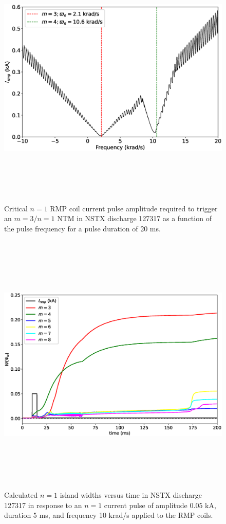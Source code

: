 \documentclass[12pt,prb,aps]{revtex4-1}
\begin{document}
\begin{figure}
\centerline{\includegraphics[height=5in]{Fig9.eps}}
\caption{Critical $n=1$ RMP coil current pulse amplitude required to trigger an $m=3/n=1$ NTM in NSTX discharge 127317 
as a function of the pulse frequency for a pulse duration of 20 ms.}\label{fig9}
\end{figure}

\begin{figure}
\centerline{\includegraphics[height=5in]{Fig10.eps}}
\caption{Calculated $n=1$ island widths versus time in NSTX discharge 127317 in response to an $n=1$ current pulse of amplitude $0.05$ kA, duration 5 ms, and frequency 10 krad/s applied to the RMP coils.}\label{fig10}
\end{figure}
\end{document}
